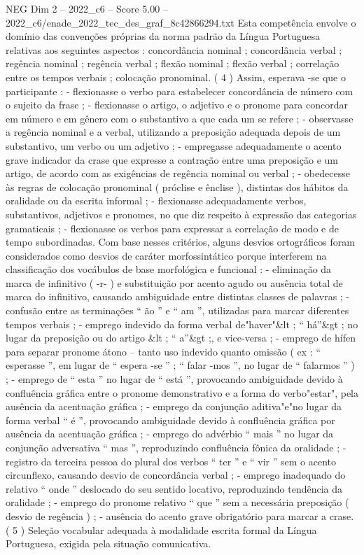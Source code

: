 \begin{textsample}{NEG Dim 2 – 2022\_c6 – Score 5.00 – 2022\_c6/enade\_2022\_tec\_des\_graf\_8c42866294.txt}
Esta competência envolve o domínio das convenções próprias da norma padrão da Língua Portuguesa relativas aos seguintes aspectos : concordância nominal ; concordância verbal ; regência nominal ; regência verbal ; flexão nominal ; flexão verbal ; correlação entre os tempos verbais ; colocação pronominal. ( 4 ) Assim, esperava -se que o participante : - flexionasse o verbo para estabelecer concordância de número com o sujeito da frase ; - flexionasse o artigo, o adjetivo e o pronome para concordar em número e em gênero com o substantivo a que cada um se refere ; - observasse a regência nominal e a verbal, utilizando a preposição adequada depois de um substantivo, um verbo ou um adjetivo ; - empregasse adequadamente o acento grave indicador da crase que expresse a contração entre uma preposição e um artigo, de acordo com as exigências de regência nominal ou verbal ; - obedecesse às regras de colocação pronominal ( próclise e ênclise ), distintas dos hábitos da oralidade ou da escrita informal ; - flexionasse adequadamente verbos, substantivos, adjetivos e pronomes, no que diz respeito à expressão das categorias gramaticais ; - flexionasse os verbos para expressar a correlação de modo e de tempo subordinadas.
Com base nesses critérios, alguns desvios ortográficos foram considerados como desvios de caráter morfossintático porque interferem na classificação dos vocábulos de base morfológica e funcional : - eliminação da marca de infinitivo ( -r- ) e substituição por acento agudo ou ausência total de marca do infinitivo, causando ambiguidade entre distintas classes de palavras ; - confusão entre as terminações “ ão ” e “ am ”, utilizadas para marcar diferentes tempos verbais ; - emprego indevido da forma verbal de"haver"\&lt ; “ há”\&gt ; no lugar da preposição ou do artigo \&lt ; “ a”\&gt ;, e vice-versa ; - emprego de hífen para separar pronome átono – tanto uso indevido quanto omissão ( ex : “ esperasse ”, em lugar de “ espera -se ” ; “ falar -mos ”, no lugar de “ falarmos ” ) ; - emprego de “ esta ” no lugar de “ está ”, provocando ambiguidade devido à confluência gráfica entre o pronome demonstrativo e a forma do verbo"estar", pela ausência da acentuação gráfica ; - emprego da conjunção aditiva"e"no lugar da forma verbal “ é ”, provocando ambiguidade devido à confluência gráfica por ausência da acentuação gráfica ; - emprego do advérbio “ mais ” no lugar da conjunção adversativa “ mas ”, reproduzindo confluência fônica da oralidade ; - registro da terceira pessoa do plural dos verbos “ ter ” e “ vir ” sem o acento circunflexo, causando desvio de concordância verbal ; - emprego inadequado do relativo “ onde ” deslocado do seu sentido locativo, reproduzindo tendência da oralidade ; - emprego do pronome relativo “ que ” sem a necessária preposição ( desvio de regência ) ; - ausência do acento grave obrigatório para marcar a crase. ( 5 ) Seleção vocabular adequada à modalidade escrita formal da Língua Portuguesa, exigida pela situação comunicativa.

\end{textsample}
